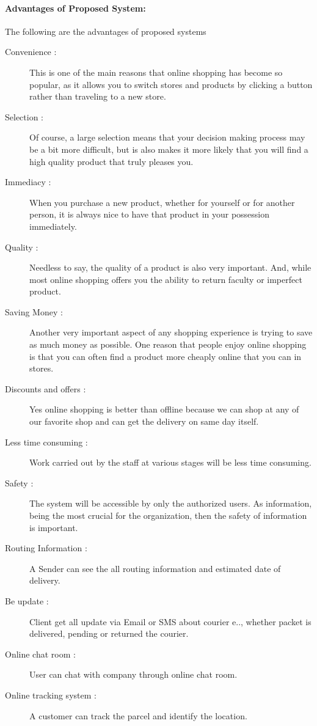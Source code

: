 \paragraph{Advantages of Proposed System:}
The following are the advantages of proposed systems
\begin{description}
	\item[Convenience : ] This is one of the main reasons that online shopping has become so popular, as it allows you to switch stores and products by clicking a button rather than traveling to a new store.
	\item[Selection : ] Of course, a large selection means that your decision making process may be a bit more difficult, but is also makes it more likely that you will find a high quality product that truly pleases you.
	\item[Immediacy : ] When you purchase a new product, whether for yourself or for another person, it is always nice to have that product in your possession immediately.
	\item[Quality : ] Needless to say, the quality of a product is also very important. And, while most online shopping offers you the ability to return faculty or imperfect product.
	\item[Saving Money : ] Another very important aspect of any shopping experience is trying to save as much money as possible. One reason that people enjoy online shopping is that you can often find a product more cheaply online that you can in stores.
	\item[Discounts and offers : ] Yes online shopping is better than offline because we can shop at any of our favorite shop and can get the delivery on same day itself.
	\item[Less time consuming : ] Work carried out by the staff at various stages will be less time consuming.
	\item[Safety : ] The system will be accessible by only the authorized users. As information, being the most crucial for the organization, then the safety of information is important.
	\item[Routing Information : ] A Sender can see the all routing information and estimated date of delivery.
	\item[Be update : ] Client get all update via Email or SMS about courier e.., whether packet is delivered, pending or returned the courier.
	\item[Online chat room : ] User can chat with company through online chat room.
	\item[Online tracking system : ] A customer can track the parcel and identify the location.
\end{description}
